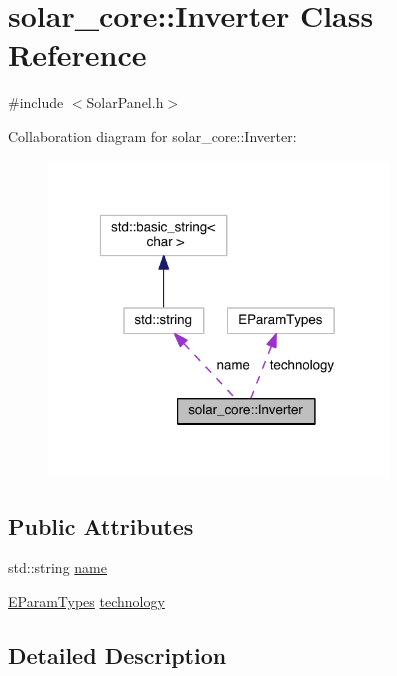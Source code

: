 \hypertarget{classsolar__core_1_1_inverter}{}\section{solar\+\_\+core\+:\+:Inverter Class Reference}
\label{classsolar__core_1_1_inverter}


{\ttfamily \#include $<$Solar\+Panel.\+h$>$}



Collaboration diagram for solar\+\_\+core\+:\+:Inverter\+:
\nopagebreak
\begin{figure}[H]
\begin{center}
\leavevmode
\includegraphics[width=256pt]{classsolar__core_1_1_inverter__coll__graph}
\end{center}
\end{figure}
\subsection*{Public Attributes}
\begin{DoxyCompactItemize}
\item 
std\+::string \hyperlink{classsolar__core_1_1_inverter_a0a63c42804f6d96c298f11c1425075d2}{name}
\item 
\hyperlink{namespacesolar__core_aa1147341e5ef7a40d68d1bd68e149362}{E\+Param\+Types} \hyperlink{classsolar__core_1_1_inverter_a793b76816cee47c3348f8854b0fec9b1}{technology}
\end{DoxyCompactItemize}


\subsection{Detailed Description}


